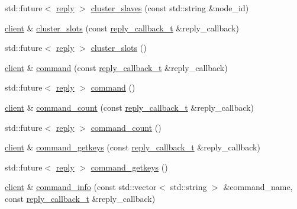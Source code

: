 \begin{DoxyCompactItemize}
\item 
std\+::future$<$ \hyperlink{classcpp__redis_1_1reply}{reply} $>$ \hyperlink{classcpp__redis_1_1client_afbfca7fb91f492768c7ac75677f433a2}{cluster\+\_\+slaves} (const std\+::string \&node\+\_\+id)
\item 
\hyperlink{classcpp__redis_1_1client}{client} \& \hyperlink{classcpp__redis_1_1client_a7d0dad34ca2fe2e301b202388bb47e10}{cluster\+\_\+slots} (const \hyperlink{classcpp__redis_1_1client_a061a1140d36d2eaeda82b09a0bb3f9f2}{reply\+\_\+callback\+\_\+t} \&reply\+\_\+callback)
\item 
std\+::future$<$ \hyperlink{classcpp__redis_1_1reply}{reply} $>$ \hyperlink{classcpp__redis_1_1client_a9dc222141ab85da05efbce7a7ff0a7d1}{cluster\+\_\+slots} ()
\item 
\hyperlink{classcpp__redis_1_1client}{client} \& \hyperlink{classcpp__redis_1_1client_accac4fab4be3f71b94fc0aa02496f6a3}{command} (const \hyperlink{classcpp__redis_1_1client_a061a1140d36d2eaeda82b09a0bb3f9f2}{reply\+\_\+callback\+\_\+t} \&reply\+\_\+callback)
\item 
std\+::future$<$ \hyperlink{classcpp__redis_1_1reply}{reply} $>$ \hyperlink{classcpp__redis_1_1client_a93ef2e84647990d02aa67a1e22341b38}{command} ()
\item 
\hyperlink{classcpp__redis_1_1client}{client} \& \hyperlink{classcpp__redis_1_1client_a639c7fd5c7899ba474e65513ee337bea}{command\+\_\+count} (const \hyperlink{classcpp__redis_1_1client_a061a1140d36d2eaeda82b09a0bb3f9f2}{reply\+\_\+callback\+\_\+t} \&reply\+\_\+callback)
\item 
std\+::future$<$ \hyperlink{classcpp__redis_1_1reply}{reply} $>$ \hyperlink{classcpp__redis_1_1client_af0cac37a62edbd7d699b379551f1ef9a}{command\+\_\+count} ()
\item 
\hyperlink{classcpp__redis_1_1client}{client} \& \hyperlink{classcpp__redis_1_1client_a3d23ff98ee82a404373d75b660720926}{command\+\_\+getkeys} (const \hyperlink{classcpp__redis_1_1client_a061a1140d36d2eaeda82b09a0bb3f9f2}{reply\+\_\+callback\+\_\+t} \&reply\+\_\+callback)
\item 
std\+::future$<$ \hyperlink{classcpp__redis_1_1reply}{reply} $>$ \hyperlink{classcpp__redis_1_1client_a18ab313316e99ab0a690540f40de80e3}{command\+\_\+getkeys} ()
\item 
\hyperlink{classcpp__redis_1_1client}{client} \& \hyperlink{classcpp__redis_1_1client_a95105c556aa5c070819bc82729d336c5}{command\+\_\+info} (const std\+::vector$<$ std\+::string $>$ \&command\+\_\+name, const \hyperlink{classcpp__redis_1_1client_a061a1140d36d2eaeda82b09a0bb3f9f2}{reply\+\_\+callback\+\_\+t} \&reply\+\_\+callback)

\end{DoxyCompactItemize}
